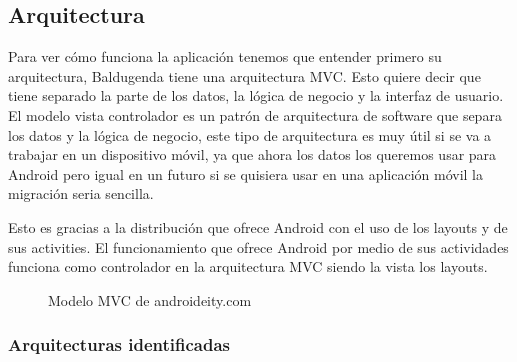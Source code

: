 \subsection{Arquitectura}
\label{subsecc:arquitectura}

Para ver cómo funciona la aplicación tenemos que entender primero su arquitectura, Baldugenda tiene una arquitectura MVC. Esto quiere decir que tiene separado la parte de los datos, la lógica de negocio y la interfaz de usuario.
El modelo vista controlador es un patrón de arquitectura de software que separa los datos y la lógica de negocio, este tipo de arquitectura es muy útil si se va a trabajar en un dispositivo móvil, ya que ahora los datos los queremos usar para Android pero igual en un futuro si se quisiera usar en una aplicación móvil la migración seria sencilla.

Esto es gracias a la distribución que ofrece Android con el uso de los layouts y de sus activities.
El funcionamiento que ofrece Android por medio de sus actividades funciona como controlador en la arquitectura MVC siendo la vista los layouts.


\begin{figure}[H] 
  \begin{center} 
    \caption{Modelo MVC de androideity.com} 
    \label{fig:ModeloMVC} 
  \end{center} 
\end{figure}


\subsubsection{Arquitecturas identificadas}
\label{subsubsecc:Arquitecturas identificadas}

